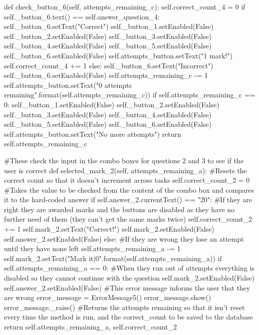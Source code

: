 \begin{landscape}
\begin{python}
    def check_button_6(self, attempts_remaining_c):
        self.correct_count_4 = 0
        if self._button_6.text() == self.answer_question_4:
            self._button_6.setText("Correct")
            self._button_1.setEnabled(False)
            self._button_2.setEnabled(False)
            self._button_3.setEnabled(False)
            self._button_4.setEnabled(False)
            self._button_5.setEnabled(False)
            self._button_6.setEnabled(False)
            self.attempts_button.setText("1 mark!")
            self.correct_count_4 += 1
        else:
            self._button_6.setText("Incorrect")
            self._button_6.setEnabled(False)
            self.attempts_remaining_c -= 1
            self.attempts_button.setText("{0} attempts remaining".format(self.attempts_remaining_c))
            if self.attempts_remaining_c == 0:
                self._button_1.setEnabled(False)
                self._button_2.setEnabled(False)
                self._button_3.setEnabled(False)
                self._button_4.setEnabled(False)
                self._button_5.setEnabled(False)
                self._button_6.setEnabled(False)
                self.attempts_button.setText("No more attempts")
            return self.attempts_remaining_c

    #These check the input in the combo boxes for questions 2 and 3 to see if the user is correct
    def selected_mark_2(self, attempts_remaining_a):
        #Resets the correct count so that it doesn't increment across tasks
        self.correct_count_2 = 0
        #Takes the value to be checked from the content of the combo box and compares it to the hard-coded answer
        if self.answer_2.currentText() == "20":
            #If they are right they are awarded marks and the buttons are disabled as they have no further need of them (they can't get the same marks twice)
            self.correct_count_2 += 1
            self.mark_2.setText("Correct!")
            self.mark_2.setEnabled(False)
            self.answer_2.setEnabled(False)
        else:
            #If they are wrong they lose an attempt until they have none left
            self.attempts_remaining_a -= 1
            self.mark_2.setText("Mark it|{0}".format(self.attempts_remaining_a))
            if self.attempts_remaining_a == 0:
                #When they run out of attempts everything is disabled so they cannot continue with the question
                self.mark_2.setEnabled(False)
                self.answer_2.setEnabled(False)
            #This error message informs the user that they are wrong
            error_message = ErrorMessage5()
            error_message.show()
            error_message._raise()
        #Returns the attempts remaining so that it isn't reset every time the method is run, and the correct_count to be saved to the database
        return self.attempts_remaining_a, self.correct_count_2
                                         

\end{python}
\end{landscape}
